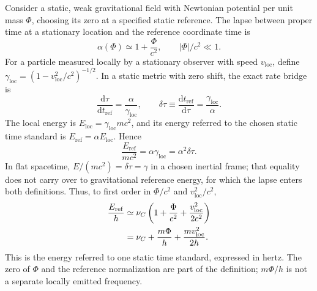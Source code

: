 \documentclass[12pt]{article}
\begin{document}
Consider a static, weak gravitational field with Newtonian potential per unit mass $\Phi$, choosing its zero at a specified static reference. The lapse between proper time at a stationary location and the reference coordinate time is
\begin{equation}
  \alpha(\Phi)\simeq1+\frac{\Phi}{c^2},
  \qquad |\Phi|/c^2\ll1.
  \label{eq:lapse}
\end{equation}
For a particle measured locally by a stationary observer with speed $v_{\mathrm{loc}}$, define $\gamma_{\mathrm{loc}}=(1-v_{\mathrm{loc}}^2/c^2)^{-1/2}$. In a static metric with zero shift, the exact rate bridge is
\begin{equation}
  \frac{\mathrm{d}\tau}{\mathrm{d}t_{\mathrm{ref}}}
  =\frac{\alpha}{\gamma_{\mathrm{loc}}},
  \qquad
  \delta\tau\equiv\frac{\mathrm{d}t_{\mathrm{ref}}}{\mathrm{d}\tau}
  =\frac{\gamma_{\mathrm{loc}}}{\alpha}.
  \label{eq:static-moving-rate}
\end{equation}
The local energy is $E_{\mathrm{loc}}=\gamma_{\mathrm{loc}}mc^2$, and its energy referred to the chosen static time standard is $E_{\mathrm{ref}}=\alpha E_{\mathrm{loc}}$. Hence
\begin{equation}
  \frac{E_{\mathrm{ref}}}{mc^2}
  =\alpha\gamma_{\mathrm{loc}}
  =\alpha^2\delta\tau.
  \label{eq:static-energy-rate-bridge}
\end{equation}
In flat spacetime, $E/(mc^2)=\delta\tau=\gamma$ in a chosen inertial frame; that equality does not carry over to gravitational reference energy, for which the lapse enters both definitions. Thus, to first order in $\Phi/c^2$ and $v_{\mathrm{loc}}^2/c^2$,
\begin{align}
  \frac{E_{\mathrm{ref}}}{h}
  &\simeq\nu_C\left(1+\frac{\Phi}{c^2}
                  +\frac{v_{\mathrm{loc}}^2}{2c^2}\right) \notag\\
  &=\nu_C+\frac{m\Phi}{h}
       +\frac{mv_{\mathrm{loc}}^2}{2h}.
  \label{eq:weak-field-energy-frequency}
\end{align}
This is the energy referred to one static time standard, expressed in hertz. The zero of $\Phi$ and the reference normalization are part of the definition; $m\Phi/h$ is not a separate locally emitted frequency.
\end{document}
